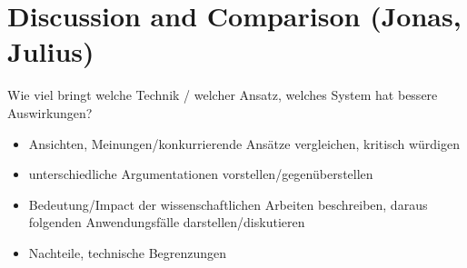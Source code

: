 \section{Discussion and Comparison (Jonas, Julius)}

Wie viel bringt welche Technik / welcher Ansatz, welches System
hat bessere Auswirkungen?

\begin{itemize}
    \item Ansichten, Meinungen/konkurrierende Ansätze vergleichen, kritisch würdigen
    \item unterschiedliche Argumentationen vorstellen/gegenüberstellen
    \item Bedeutung/Impact der wissenschaftlichen Arbeiten beschreiben, daraus folgenden Anwendungsfälle darstellen/diskutieren
    \item Nachteile, technische Begrenzungen

\end{itemize}